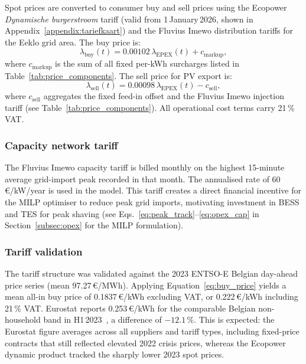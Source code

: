 \documentclass[11pt,a4paper]{report}
\begin{document}
Spot prices are converted to consumer buy and sell prices using the Ecopower
\textit{Dynamische burgerstroom} tariff \cite{Ecopower2026tariff} (valid from
1\,January\,2026, shown in Appendix~\ref{appendix:tariefkaart}) and the Fluvius
Imewo distribution tariffs for the Eeklo grid area.
The buy price is:
\begin{equation}
    \lambda_\mathrm{buy}(t) = 0.00102\,\lambda_\mathrm{EPEX}(t) + c_\mathrm{markup},
    \label{eq:buy_price}
\end{equation}
where $c_\mathrm{markup}$ is the sum of all fixed per-kWh surcharges listed in
Table~\ref{tab:price_components}.
The sell price for PV export is:
\begin{equation}
    \lambda_\mathrm{sell}(t) = 0.00098\,\lambda_\mathrm{EPEX}(t) - c_\mathrm{sell},
    \label{eq:sell_price}
\end{equation}
where $c_\mathrm{sell}$ aggregates the fixed feed-in offset and the Fluvius Imewo
injection tariff (see Table~\ref{tab:price_components}).
All operational cost terms carry 21\,\% VAT\@.

\subsubsection{Capacity network tariff}

The Fluvius Imewo capacity tariff is billed monthly on the highest 15-minute average
grid-import peak recorded in that month.
The annualised rate of 60\,\euro/kW/year is used in the model.
This tariff creates a direct financial incentive for the MILP optimiser to reduce peak
grid imports, motivating investment in BESS and TES for peak shaving
(see Eqs.~\eqref{eq:peak_track}--\eqref{eq:opex_cap} in
Section~\ref{subsec:opex} for the MILP formulation).

\subsubsection{Tariff validation}

The tariff structure was validated against the 2023 ENTSO-E Belgian day-ahead price
series (mean 97.27\,\euro/MWh).
Applying Equation~\eqref{eq:buy_price} yields a mean all-in buy price of
0.1837\,\euro/kWh excluding VAT, or 0.222\,\euro/kWh including 21\,\% VAT.
Eurostat reports 0.253\,\euro/kWh for the comparable Belgian non-household band in
H1\,2023~\cite{Eurostat_nrg_pc_205}, a difference of $-12.1$\,\%.
This is expected: the Eurostat figure averages across all suppliers and tariff types,
including fixed-price contracts that still reflected elevated 2022 crisis prices,
whereas the Ecopower dynamic product tracked the sharply lower 2023 spot prices.
\end{document}
